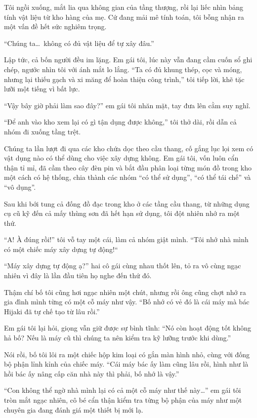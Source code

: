 \documentclass[../main.tex]{subfiles}
\begin{document}
Tôi ngồi xuống, mắt lia qua không gian của tầng thượng, rồi lại liếc nhìn bảng tính vật liệu từ kho hàng của mẹ. Cứ đang mải mê tính toán, tôi bỗng nhận ra một vấn đề hết sức nghiêm trọng.

``Chúng ta\dots\ không có đủ vật liệu để tự xây đâu.''

Lập tức, cả bốn người đều im lặng. Em gái tôi, lúc này vẫn đang cầm cuốn sổ ghi chép, ngước nhìn tôi với ánh mắt lo lắng. ``Ta có đủ khung thép, cọc và móng, nhưng lại thiếu gạch và xi măng để hoàn thiện công trình,'' tôi tiếp lời, khẽ tặc lưỡi một tiếng vì bất lực.

``Vậy bây giờ phải làm sao đây?'' em gái tôi nhăn mặt, tay đưa lên cằm suy nghĩ.

``Để anh vào kho xem lại có gì tận dụng được không,'' tôi thở dài, rồi dẫn cả nhóm đi xuống tầng trệt.

Chúng ta lần lượt đi qua các kho chứa dọc theo cầu thang, cố gắng lục lọi xem có vật dụng nào có thể dùng cho việc xây dựng không. Em gái tôi, vốn luôn cẩn thận tỉ mỉ, đã cầm theo cây đèn pin và bắt đầu phân loại từng món đồ trong kho một cách có hệ thống, chia thành các nhóm ``có thể sử dụng'', ``có thể tái chế'' và ``vô dụng''.

Sau khi bới tung cả đống đồ đạc trong kho ở các tầng cầu thang, từ những dụng cụ cũ kỹ đến cả mấy thùng sơn đã hết hạn sử dụng, tôi đột nhiên nhớ ra một thứ.

``A! À đúng rồi!'' tôi vỗ tay một cái, làm cả nhóm giật mình. ``Tôi nhớ nhà mình có một chiếc máy xây dựng tự động!``

``Máy xây dựng tự động ạ?'' hai cô gái cùng nhau thốt lên, tỏ ra vô cùng ngạc nhiên vì đây là lần đầu tiên họ nghe đến thứ đó.

Thậm chí bố tôi cũng hơi ngạc nhiên một chút, nhưng rồi ông cũng chợt nhớ ra gia đình mình từng có một cỗ máy như vậy. ``Bố nhớ có vẻ đó là cái máy mà bác Hijaki đã tự chế tạo từ lâu rồi.''

Em gái tôi lại hỏi, giọng vẫn giữ được sự bình tĩnh: ``Nó còn hoạt động tốt không hả bố? Nếu là máy cũ thì chúng ta nên kiểm tra kỹ lưỡng trước khi dùng.''

Nói rồi, bố tôi lôi ra một chiếc hộp kim loại có gắn màn hình nhỏ, cùng với đống bộ phận lỉnh kỉnh của chiếc máy. ``Cái máy bác ấy làm cũng lâu rồi, hình như là hồi bác ấy nâng cấp căn nhà này thì phải, bố nhớ là vậy.''

``Con không thể ngờ nhà mình lại có cả một cỗ máy như thế này\dots'' em gái tôi tròn mắt ngạc nhiên, cô bé cẩn thận kiểm tra từng bộ phận của máy như một chuyên gia đang đánh giá một thiết bị mới lạ.
\end{document}

